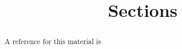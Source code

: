 \documentclass{ximera}
\title{Sections}
\begin{document}
    \begin{abstract} A reference for this material is   \end{abstract}
    \maketitle
\end{document}
